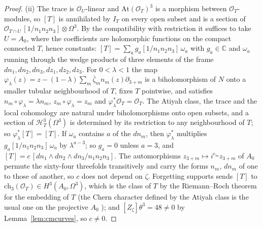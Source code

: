 \documentclass[11pt,reqno]{amsart}
\numberwithin{equation}{section}
\theoremstyle{plain}
\theoremstyle{definition}
\newcommand{\CC}{\mathbb{C}}
\newcommand{\ch}{\mathrm{ch}}
\begin{document}
\begin{proof}
(ii) The trace is $\mathcal{O}_{U}$-linear and $\mathrm{At}(\mathcal{O}_{T})^{3}$ is a morphism between $\mathcal{O}_{T}$-modules, so $[T]$ is annihilated by $I_{T}$ on every open subset and is a section of $\mathcal{O}_{T\cap U}\,[1/n_{1}n_{2}n_{3}]\otimes\Omega^{3}$. By the compatibility with restriction it suffices to take $U=A_{0}$, where the coefficients are holomorphic functions on the compact connected $T$, hence constants: $[T]=\sum_{a}g_{a}[1/n_{1}n_{2}n_{3}]\,\omega_{a}$ with $g_{a}\in\CC$ and $\omega_{a}$ running through the wedge products of three elements of the frame $dn_{1},dn_{2},dn_{3},dz_{1},dz_{2},dz_{3}$. For $0<\lambda<1$ the map $\varphi_{\lambda}(z)=z-(1-\lambda)\sum_{m}\bar\zeta_{m}n_{m}(z)\partial_{3+m}$ is a biholomorphism of $N$ onto a smaller tubular neighbourhood of $T$, fixes $T$ pointwise, and satisfies $n_{m}\circ\varphi_{\lambda}=\lambda n_{m}$, $z_{m}\circ\varphi_{\lambda}=z_{m}$ and $\varphi_{\lambda}^{*}\mathcal{O}_{T}=\mathcal{O}_{T}$. The Atiyah class, the trace and the local cohomology are natural under biholomorphisms onto open subsets, and a section of $\mathcal{H}^{3}_{T}(\Omega^{3})$ is determined by its restriction to any neighbourhood of $T$; so $\varphi_{\lambda}^{*}[T]=[T]$. If $\omega_{a}$ contains $a$ of the $dn_{m}$, then $\varphi_{\lambda}^{*}$ multiplies $g_{a}[1/n_{1}n_{2}n_{3}]\,\omega_{a}$ by $\lambda^{a-3}$; so $g_{a}=0$ unless $a=3$, and $[T]=c\,[dn_{1}\wedge dn_{2}\wedge dn_{3}/n_{1}n_{2}n_{3}]$. The automorphisms $z_{3+m}\mapsto i^{e_{m}}z_{3+m}$ of $A_{0}$ permute the sixty-four threefolds transitively and carry the forms $n_{m}$, $dn_{m}$ of one to those of another, so $c$ does not depend on $\zeta$. Forgetting supports sends $[T]$ to $\ch_{3}(\mathcal{O}_{T})\in H^{3}(A_{0},\Omega^{3})$, which is the class of $T$ by the Riemann--Roch theorem for the embedding of $T$ \cite[Ch.~15]{Ful98} (the Chern character defined by the Atiyah class is the usual one on the projective $A_{0}$ \cite{BF03}); and $[Z_{\zeta}]\theta^{3}=48\ne0$ by Lemma~\ref{lem:cmcurves}, so $c\ne0$.


\end{proof}
\end{document}
